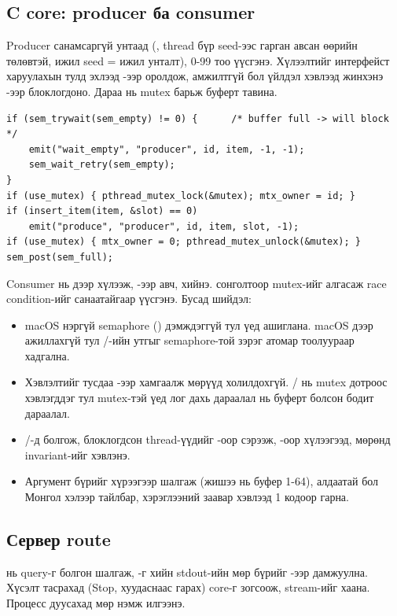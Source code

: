 \documentclass[12pt,a4paper]{article}
\begin{document}
\subsection{C core: producer ба consumer}
Producer санамсаргүй унтаад (, thread бүр seed-ээс гарган авсан өөрийн төлөвтэй, ижил seed = ижил унталт), 0-99 тоо үүсгэнэ. Хүлээлтийг интерфейст харуулахын тулд эхлээд -ээр оролдож, амжилтгүй бол  үйлдэл хэвлээд жинхэнэ -ээр блоклогдоно. Дараа нь mutex барьж буферт тавина.

\begin{lstlisting}[title={\textbf{Код 3.} Producer-ийн гол хэсэг (src/core/pc.c, товчилсон)}]
if (sem_trywait(sem_empty) != 0) {      /* buffer full -> will block */
    emit("wait_empty", "producer", id, item, -1, -1);
    sem_wait_retry(sem_empty);
}
if (use_mutex) { pthread_mutex_lock(&mutex); mtx_owner = id; }
if (insert_item(item, &slot) == 0)
    emit("produce", "producer", id, item, slot, -1);
if (use_mutex) { mtx_owner = 0; pthread_mutex_unlock(&mutex); }
sem_post(sem_full);
\end{lstlisting}

Consumer нь  дээр хүлээж, -ээр авч,  хийнэ.  сонголтоор mutex-ийг алгасаж race condition-ийг санаатайгаар үүсгэнэ. Бусад шийдэл:
\begin{itemize}
  \item macOS нэргүй semaphore () дэмждэггүй тул  үед  ашиглана.  macOS дээр ажиллахгүй тул /-ийн утгыг semaphore-той зэрэг атомар тоолуураар хадгална.
  \item Хэвлэлтийг тусдаа -ээр хамгаалж мөрүүд холилдохгүй. / нь mutex дотроос хэвлэгддэг тул mutex-тэй үед лог дахь дараалал нь буферт болсон бодит дараалал.
  \item {}/-д  болгож, блоклогдсон thread-үүдийг -оор сэрээж, -оор хүлээгээд,  мөрөнд invariant-ийг хэвлэнэ.
  \item Аргумент бүрийг хүрээгээр шалгаж (жишээ нь буфер 1-64), алдаатай бол Монгол хэлээр тайлбар, хэрэглээний заавар хэвлээд 1 кодоор гарна.
\end{itemize}

\subsection{Сервер route}
 нь query-г  болгон шалгаж, -г  хийн stdout-ийн мөр бүрийг -ээр дамжуулна. Хүсэлт тасрахад (Stop, хуудаснаас гарах) core-г зогсоож, stream-ийг хаана. Процесс дуусахад  мөр нэмж илгээнэ.
\end{document}
